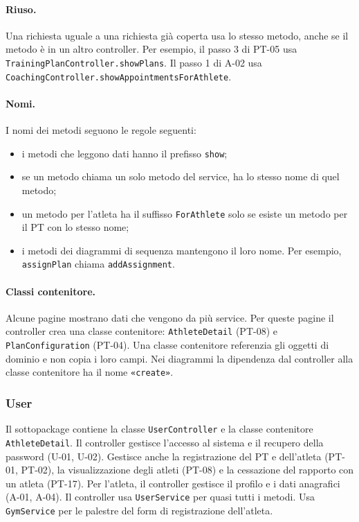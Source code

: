 \paragraph{Riuso.} Una richiesta uguale a una richiesta già coperta usa
lo stesso metodo, anche se il metodo è in un altro controller. Per
esempio, il passo 3 di PT-05 usa \texttt{TrainingPlanController.showPlans}.
Il passo 1 di A-02 usa
\texttt{CoachingController.showAppointmentsForAthlete}.

\paragraph{Nomi.} I nomi dei metodi seguono le regole seguenti:
\begin{itemize}
  \item i metodi che leggono dati hanno il prefisso \texttt{show};
  \item se un metodo chiama un solo metodo del service, ha lo stesso
    nome di quel metodo;
  \item un metodo per l'atleta ha il suffisso \texttt{ForAthlete} solo
    se esiste un metodo per il PT con lo stesso nome;
  \item i metodi dei diagrammi di sequenza mantengono il loro nome. Per
    esempio, \texttt{assignPlan} chiama \texttt{addAssignment}.
\end{itemize}

\paragraph{Classi contenitore.} Alcune pagine mostrano dati che vengono
da più service. Per queste pagine il controller crea una classe
contenitore: \texttt{AthleteDetail} (PT-08) e
\texttt{PlanConfiguration} (PT-04). Una classe contenitore referenzia
gli oggetti di dominio e non copia i loro campi. Nei diagrammi la
dipendenza dal controller alla classe contenitore ha il nome
{\selectfont\texttt{«create»}}.

\subsubsection{User}
Il sottopackage contiene la classe \texttt{UserController} e la classe
contenitore \texttt{AthleteDetail}. Il controller gestisce l'accesso al
sistema e il recupero della password (U-01, U-02). Gestisce anche la
registrazione del PT e dell'atleta (PT-01, PT-02), la visualizzazione
degli atleti (PT-08) e la cessazione del rapporto con un atleta
(PT-17). Per l'atleta, il controller gestisce il profilo e i dati
anagrafici (A-01, A-04). Il controller usa \texttt{UserService} per
quasi tutti i metodi. Usa \texttt{GymService} per le palestre del form
di registrazione dell'atleta.

